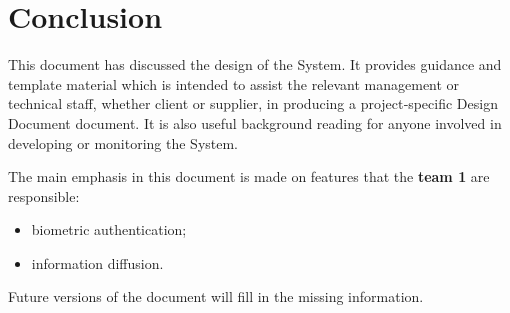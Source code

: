 \chapter{Conclusion}
\label{chap:final_conclusion}

This document has discussed the design of the \msricrash System.
It provides guidance and template material which is intended to assist the relevant 
management or technical staff, whether client or supplier, in producing a project‑specific 
Design Document document. It is also useful background reading for anyone involved 
in developing or monitoring the \msricrash System. 

The main emphasis in this document is made on features that the \textbf{team 1}
are responsible: 
\begin{itemize}
  \item biometric authentication;
  \item information diffusion.
\end{itemize}
Future versions of the document will fill in the missing information.
